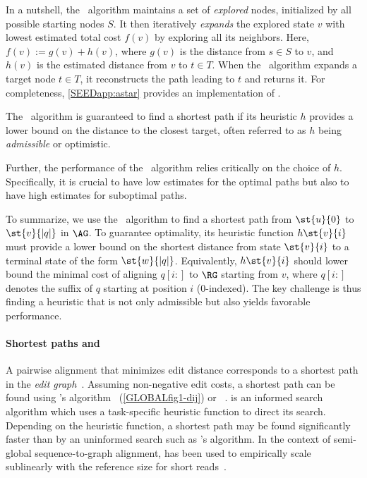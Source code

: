 % 
In a nutshell, the \A~algorithm maintains a set of \emph{explored} nodes,
initialized by all possible starting nodes $S$. It then iteratively
\emph{expands} the explored state $v$ with lowest estimated total cost $f(v)$ by
exploring all its neighbors. Here, $f(v) := g(v) + h(v)$, where $g(v)$ is the
distance from $s \in S$ to $v$, and $h(v)$ is the estimated distance from $v$ to
$t \in T$.
%
When the \A~algorithm expands a target node $t \in T$, it reconstructs the path
leading to $t$ and returns it.
%
For completeness, \cref{SEEDapp:astar} provides an implementation of \A.

%
The \A~algorithm is guaranteed to find a shortest path if its heuristic $h$
provides a lower bound on the distance to the closest target, often referred to
as $h$ being \emph{admissible} or optimistic.

Further, the performance of the \A~algorithm relies critically on the choice of
$h$. Specifically, it is crucial to have low estimates for the optimal paths but
also to have high estimates for suboptimal paths.

%
To summarize, we use the \A~algorithm to find a shortest path from $\st{u}{0}$
to $\st{v}{|q|}$ in $\AG$. To guarantee optimality, its heuristic function
$h\st{v}{i}$ must provide a lower bound on the shortest distance from state
$\st{v}{i}$ to a terminal state of the form $\st{w}{\lvert q \rvert}$.
%
Equivalently, $h\st{v}{i}$ should lower bound the minimal cost of aligning
$q[i{:}]$ to $\RG$ starting from $v$, where $q[i{:}]$ denotes the suffix of $q$
starting at position $i$ ($0$-indexed).
%
The key challenge is thus finding a heuristic that is not only admissible but
also yields favorable performance.

\paragraph{Shortest paths and \A}
A pairwise alignment that minimizes edit distance corresponds to a shortest path in the
\emph{edit graph}~\citep{vintsyuk1968speech,ukkonen1985algorithms}. Assuming
non-negative edit costs, a shortest path can be found using \dijkstra's
algorithm~\citep{ukkonen1985algorithms} (\cref{GLOBALfig1-dij}) or
\A~\citep{spouge1989speeding}. \A is an informed search algorithm which uses a
task-specific heuristic function to direct its search. Depending on the
heuristic function, a shortest path may be found significantly faster than by an
uninformed search such as \dijkstra's algorithm. In the context of semi-global
sequence-to-graph alignment, \A has been used to empirically scale sublinearly
with the reference size for short reads~\citep{ivanov2020astarix}.
